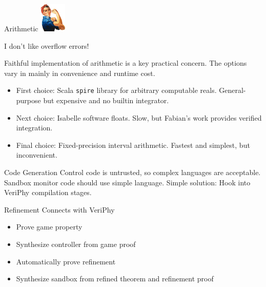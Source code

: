 \documentclass[slidestop,aspectratio=169]{beamer}
\newcommand{\engineer}[1][1in]{\includegraphics[width=#1]{img/rosie.png}}
\newcommand{\speak}[2]{\small\begin{minipage}{1.3in}{#1}{#2}\end{minipage}}
\newcommand{\say}[1]{\speak{#1}{}}
\theoremstyle{plain}
\theoremstyle{definition}
\theoremstyle{remark}
\begin{document}
\begin{frame}[t]{Arithmetic}
\engineer[0.5in]\say{I don't like overflow errors!}

Faithful implementation of arithmetic is a key practical concern.
The options vary in mainly in convenience and runtime cost.
\begin{itemize}
\item First choice:
Scala \texttt{spire} library for arbitrary computable reals.
General-purpose but expensive and no builtin integrator.
\item Next choice:
Isabelle software floats.
Slow, but Fabian's work provides verified integration.
\item Final choice:
Fixed-precision interval arithmetic.
Fastest and simplest, but inconvenient.
\end{itemize}
\end{frame}

\begin{frame}[t]{Code Generation}
Control code is untrusted, so complex languages are acceptable.
Sandbox monitor code should use simple language.
Simple solution: Hook into VeriPhy compilation stages.
\end{frame}

\begin{frame}[t]{Refinement Connects with VeriPhy}
  \begin{itemize}
  \item Prove game property
  \item Synthesize controller from game proof
  \item Automatically prove refinement
  \item Synthesize sandbox from refined theorem and refinement proof
  \end{itemize}
\end{frame}
\end{document}
